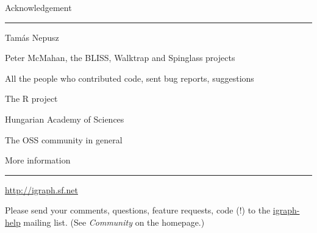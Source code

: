 \documentclass[landscape,fleqno]{foils}
\newcommand{\cstitle}[1]{{\centering\color{blue}\Large #1\par\vspace*{10pt}\hrule}}
\begin{document}
\newpage
\cstitle{Acknowledgement}

\begin{center}
\vfill
Tam\'as Nepusz\par\vfil
Peter McMahan, the BLISS, Walktrap and Spinglass projects\par\vfil
All the people who contributed code, sent bug reports, suggestions\par\vfil
The R project\par\vfil
Hungarian Academy of Sciences\par\vfil
The OSS community in general\par\vfill
\end{center}

\newpage
\cstitle{More information}
\begin{center}
\vfill
\centerline{\LARGE\url{http://igraph.sf.net}}\par\vspace*{3cm}
Please send your comments, questions, feature requests, code (!) to the
\url{igraph-help} mailing list. (See \textit{Community} on the
homepage.)\par\vfill
\end{center}
\end{document}
